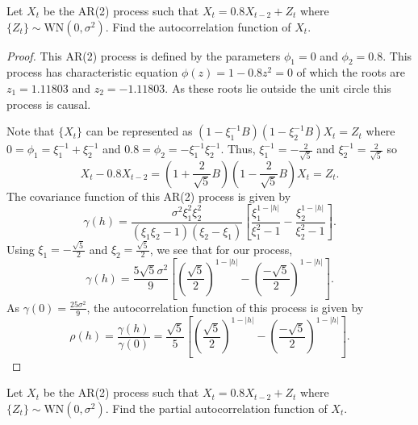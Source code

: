 \documentclass[12pt]{article}
\theoremstyle{definition}
\newenvironment{custompbm}[1]
  {\renewcommand\theproblem{#1}\problem}
  {\endproblem}
\begin{document}
\begin{custompbm}{2.a}
  Let $X_t$ be the AR(2) process such that $X_t = 0.8X_{t-2} + Z_t$ where $\{Z_t\}\sim \text{WN}(0, \sigma^2)$.
  Find the autocorrelation function of $X_t$.
\end{custompbm}

\begin{proof}
  This AR(2) process is defined by the parameters $\phi_1 = 0$ and $\phi_2 = 0.8$.
  This process has characteristic equation $\phi(z) = 1 - 0.8z^2 = 0$ of which
  the roots are $z_1 = 1.11803$ and $z_2 = -1.11803$. As these roots lie outside the unit
  circle this process is causal.

  Note that $\{X_t\}$ can be represented as $(1 - \xi_1^{-1}B)(1 - \xi_2^{-1}B)X_t = Z_t$ where
  $0 = \phi_1 = \xi_1^{-1} + \xi_2^{-1}$ and $0.8 = \phi_2 =-\xi_1^{-1} \xi_2^{-1}$. Thus,
  $\xi_1^{-1} = - \frac{2}{\sqrt{5}}$ and $\xi_2^{-1} = \frac{2}{\sqrt{5}}$ so
  \[
    X_t - 0.8 X_{t-2} = \left(1 + \frac{2}{\sqrt{5}}B\right)\left(1 - \frac{2}{\sqrt{5}}B\right)X_t = Z_t.
  \]
  The covariance function of this AR(2) process is given by
  \[
    \gamma(h) = \frac{\sigma^2 \xi_1^2 \xi_2^2}{(\xi_1 \xi_2 - 1)(\xi_2 - \xi_1)}\left[\frac{\xi_1^{1-|h|}}{\xi_1^2 - 1} - \frac{\xi_2^{1-|h|}}{\xi_2^2 - 1}\right].
  \]
  Using $\xi_1 = -\frac{\sqrt{5}}{2} $ and $\xi_2 = \frac{\sqrt{5}}{2}$, we see that for our process,
  \[
    \gamma(h) = \frac{5\sqrt{5}\sigma^2}{9}\left[\left(\frac{\sqrt{5}}{2}\right)^{1-|h|} - \left(\frac{-\sqrt{5}}{2}\right)^{1-|h|}\right].
  \]
  As $\gamma(0) = \frac{25 \sigma^2}{9}$, the autocorrelation function of this process is given by
  \[
    \rho(h) = \frac{\gamma(h)}{\gamma(0)} = \frac{\sqrt{5}}{5}\left[\left(\frac{\sqrt{5}}{2}\right)^{1-|h|} - \left(\frac{-\sqrt{5}}{2}\right)^{1-|h|}\right].
  \]
\end{proof}


\begin{custompbm}{2.b}
  Let $X_t$ be the AR(2) process such that $X_t = 0.8X_{t-2} + Z_t$ where $\{Z_t\}\sim \text{WN}(0, \sigma^2)$.
  Find the partial autocorrelation function of $X_t$.
\end{custompbm}
\end{document}
